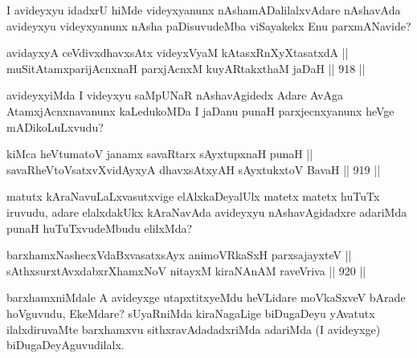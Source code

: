 \begin{artha}
I avideyxyu idadxrU hiMde videyxyanunx nAshamADalilalxvAdare nAshavAda avideyxyu videyxyanunx nAsha paDisuvudeMba viSayakekx Enu parxmANavide?
\end{artha}

\begin{shl}
avidayxyA ceVdivxdhavxsAtx videyxVyaM kAtasxRnXyXtasatxdA || \\
muSitAtamxparijAcnxnaH parxjAcnxM kuyARtakxthaM jaDaH \hfill || 918 ||  
\end{shl}

\begin{artha}
avideyxyiMda I videyxyu saMpUNaR nAshavAgidedx Adare AvAga AtamxjAcnxnavanunx kaLedukoMDa I jaDanu punaH parxjecnxyanunx heVge mADikoLuLxvudu?
\end{artha}

\begin{shl}
kiMca heVtumatoV janamx savaRtarx sAyxtupxnaH punaH || \\
savaRheVtoVsatxvXvidAyxyA dhavxsAtxyAH sAyxtukxtoV BavaH \hfill || 919 ||  
\end{shl}

\begin{artha}
matutx kAraNavuLaLxvasutxvige elAlxkaDeyalUlx matetx matetx huTuTx iruvudu, adare elalxdakUkx kAraNavAda avideyxyu nAshavAgidadxre adariMda punaH huTuTxvudeMbudu elilxMda?
\end{artha}

\begin{shl}
barxhamxNashecxVdaBxvasatxsAyx animoVRkaSxH parxsajayxteV || \\
sAthxsurxtAvxdabxrXhamxNoV nitayxM kiraNAnAM raveVriva \hfill || 920 ||  
\end{shl}

\begin{artha}
barxhamxniMdale A avideyxge utapxtitxyeMdu heVLidare moVkaSxveV bArade hoVguvudu, EkeMdare? sUyaRniMda kiraNagaLige biDugaDeyu yAvatutx ilalxdiruvaMte barxhamxvu sithxravAdadadxriMda adariMda (I avideyxge) biDugaDeyAguvudilalx.
\end{artha}





